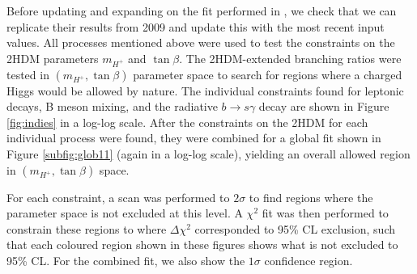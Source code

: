 \documentclass[a4paper,12pt]{article}
\begin{document}
Before updating and expanding on the fit performed in \cite{desc}, we check that we can replicate their results from 2009 and update this with the most recent input values. 
All processes mentioned above were used to test the constraints on the 2HDM parameters $m_{H^+}$ and $\tan\beta$. 
The 2HDM-extended branching ratios were tested in $(m_{H^+},\tan\beta)$ parameter space to search for regions where a charged Higgs would be allowed by nature. 
The individual constraints found for leptonic decays, B meson mixing, and the radiative $b\to s\gamma$ decay are shown in Figure \ref{fig:indies} in a log-log scale.
After the constraints on the 2HDM for each individual process were found, they were combined for a global fit shown in Figure \ref{subfig:glob11} (again in a log-log scale), yielding an overall allowed region in $(m_{H^+},\tan\beta)$ space. 

For each constraint, a scan was performed to $2\sigma$ to find regions where the parameter space is not excluded at this level. 
A $\chi^2$ fit was then performed to constrain these regions to where $\Delta\chi^2$ corresponded to 95\% CL exclusion, such that each coloured region shown in these figures shows what is not excluded to 95\% CL.
For the combined fit, we also show the $1\sigma$ confidence region. 
\end{document}

